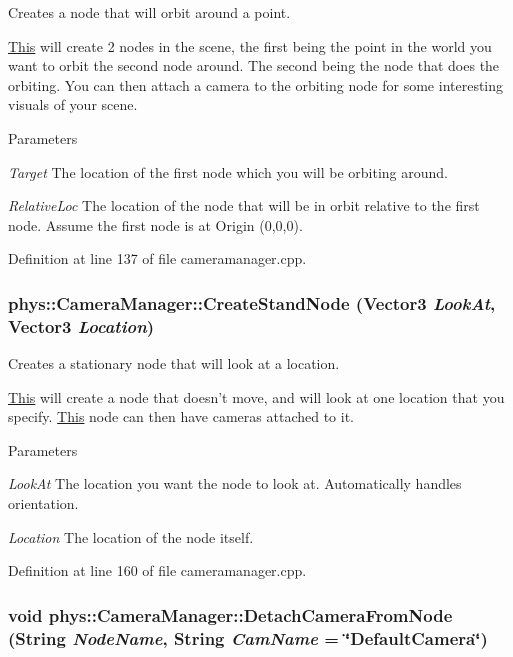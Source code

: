 Creates a node that will orbit around a point. 

\hyperlink{structThis}{This} will create 2 nodes in the scene, the first being the point in the world you want to orbit the second node around. The second being the node that does the orbiting. You can then attach a camera to the orbiting node for some interesting visuals of your scene. 
\begin{DoxyParams}{Parameters}
\item[{\em Target}]The location of the first node which you will be orbiting around. \item[{\em RelativeLoc}]The location of the node that will be in orbit relative to the first node. Assume the first node is at Origin (0,0,0). \end{DoxyParams}


Definition at line 137 of file cameramanager.cpp.

\hypertarget{classphys_1_1CameraManager_ab5f9ca6b053670e69f5812cf573d5972}{
\subsubsection[{CreateStandNode}]{ phys::CameraManager::CreateStandNode ({\bf Vector3} {\em LookAt}, \/  {\bf Vector3} {\em Location})}}
\label{d9/d91/classphys_1_1CameraManager_ab5f9ca6b053670e69f5812cf573d5972}


Creates a stationary node that will look at a location. 

\hyperlink{structThis}{This} will create a node that doesn't move, and will look at one location that you specify. \hyperlink{structThis}{This} node can then have cameras attached to it. 
\begin{DoxyParams}{Parameters}
\item[{\em LookAt}]The location you want the node to look at. Automatically handles orientation. \item[{\em Location}]The location of the node itself. \end{DoxyParams}


Definition at line 160 of file cameramanager.cpp.

\hypertarget{classphys_1_1CameraManager_a5137bdb9dec706fa0fafec665d4f71c8}{
\subsubsection[{DetachCameraFromNode}]{\setlength{\rightskip}{0pt plus 5cm}void phys::CameraManager::DetachCameraFromNode ({\bf String} {\em NodeName}, \/  {\bf String} {\em CamName} = {\ttfamily \char`\"{}DefaultCamera\char`\"{}})}}
\label{d9/d91/classphys_1_1CameraManager_a5137bdb9dec706fa0fafec665d4f71c8}


